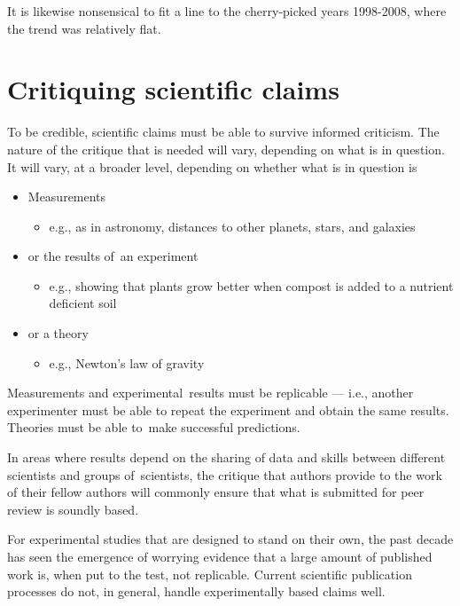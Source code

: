\documentclass[
  10pt,
  b5paper]{book}
\providecommand{\tightlist}{%
  \setlength{\itemsep}{0pt}\setlength{\parskip}{0pt}}
\begin{document}
It is likewise nonsensical to fit a line to the cherry-picked
years 1998-2008, where the trend was relatively flat.

\hypertarget{critiquing-scientific-claims}{%
\chapter{Critiquing scientific claims}\label{critiquing-scientific-claims}}

To be credible, scientific claims must be able to survive
informed criticism. The nature of the critique that is
needed will vary, depending on what is in question.
It will vary, at a broader level, depending on whether
what is in question is

\begin{itemize}
\tightlist
\item
  Measurements

  \begin{itemize}
  \tightlist
  \item
    e.g., as in astronomy, distances to other planets,
    stars, and galaxies
  \end{itemize}
\item
  or the results of~an experiment

  \begin{itemize}
  \tightlist
  \item
    e.g., showing that plants grow better when compost is
    added to a nutrient deficient soil
  \end{itemize}
\item
  or a theory

  \begin{itemize}
  \tightlist
  \item
    e.g., Newton's law of gravity
  \end{itemize}
\end{itemize}

Measurements and experimental~results must be replicable
--- i.e., another experimenter must be able to repeat the
experiment and obtain the same results. Theories must
be able to~make successful predictions.

In areas where results depend on the sharing of data and
skills between different scientists and groups of~scientists,
the critique that authors provide to the work of their fellow
authors will commonly ensure that what is submitted for peer
review is soundly based.

For experimental studies that are
designed to stand on their own, the past decade has seen the
emergence of worrying evidence that a large amount of
published work is, when put to the test, not replicable.
Current scientific publication processes do not, in general,
handle experimentally based claims well.
\end{document}
